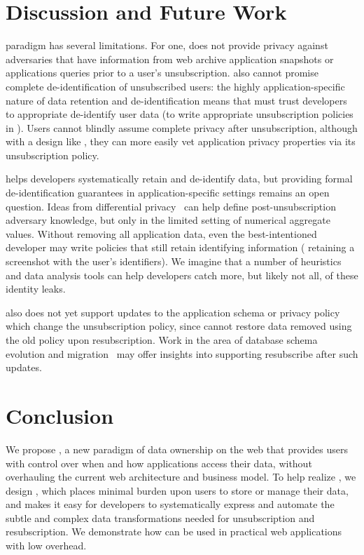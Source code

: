 \section{Discussion and Future Work}
\name paradigm has several limitations.
For one, \name does not provide privacy against adversaries that have information from web archive
application snapshots or applications queries prior to a user's unsubscription. \name also cannot
promise complete de-identification of unsubscribed users: the highly application-specific nature of
data retention and de-identification means that \name must trust developers to appropriate
de-identify user data (\eg to write appropriate unsubscription policies in \sys). Users cannot
blindly assume complete privacy after unsubscription, although with a design like \sys, they can
more easily vet application privacy properties via its unsubscription policy.

\sys helps developers systematically retain and de-identify data, but providing formal
de-identification guarantees in application-specific settings remains an open question. Ideas from
differential privacy~\cite{pinq} can help define post-unsubscription adversary knowledge, but only
in the limited setting of numerical aggregate values.  Without removing all application data, even
the best-intentioned developer may write policies that still retain identifying information (\eg
retaining a screenshot with the user's identifiers). We imagine that a number of heuristics and data
analysis tools can help developers catch more, but likely not all, of these identity leaks.

\sys also does not yet support updates to the application schema or privacy policy which change the
unsubscription policy, since \sys cannot restore data removed using the old policy upon
resubscription. Work in the area of database schema evolution and migration~\cite{schema:evo} may
offer insights into supporting resubscribe after such updates.

\section{Conclusion}
We propose \name, a new paradigm of data ownership on the web that provides users with control over
when and how applications access their data, without overhauling the current web architecture and
business model. To help realize \name, we design \sys, which places minimal burden upon
users to store or manage their data, and makes it easy for developers to 
systematically express and automate the subtle and complex data transformations needed
for unsubscription and resubscription. We demonstrate how \sys can be used in practical web
applications with low overhead.

